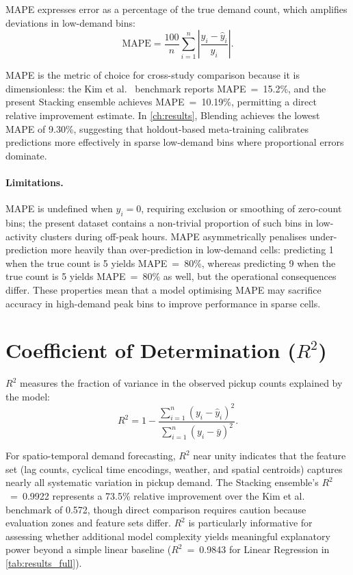 MAPE expresses error as a percentage of the true demand count, which amplifies deviations in low-demand bins:
\begin{equation}
 \text{MAPE} = \frac{100}{n}\sum_{i=1}^n \left|\frac{y_i - \hat{y}_i}{y_i}\right|.
 \label{eq:mape}
\end{equation}

MAPE is the metric of choice for cross-study comparison because it is dimensionless: the Kim et al.~\parencite{kim2020hybrid} benchmark reports MAPE~=~15.2\%, and the present Stacking ensemble achieves MAPE~=~10.19\%, permitting a direct relative improvement estimate. In \autoref{ch:results}, Blending achieves the lowest MAPE of 9.30\%, suggesting that holdout-based meta-training calibrates predictions more effectively in sparse low-demand bins where proportional errors dominate.

\paragraph{Limitations.} MAPE is undefined when $y_i = 0$, requiring exclusion or smoothing of zero-count bins; the present dataset contains a non-trivial proportion of such bins in low-activity clusters during off-peak hours. MAPE asymmetrically penalises under-prediction more heavily than over-prediction in low-demand cells: predicting 1 when the true count is 5 yields MAPE~=~80\%, whereas predicting 9 when the true count is 5 yields MAPE~=~80\% as well, but the operational consequences differ. These properties mean that a model optimising MAPE may sacrifice accuracy in high-demand peak bins to improve performance in sparse cells.

\section{Coefficient of Determination ($R^2$)}

$R^2$ measures the fraction of variance in the observed pickup counts explained by the model:
\begin{equation}
 R^2 = 1 - \frac{\displaystyle\sum_{i=1}^n(y_i-\hat{y}_i)^2}{\displaystyle\sum_{i=1}^n(y_i - \bar{y})^2}.
 \label{eq:r2}
\end{equation}

For spatio-temporal demand forecasting, $R^2$ near unity indicates that the feature set (lag counts, cyclical time encodings, weather, and spatial centroids) captures nearly all systematic variation in pickup demand. The Stacking ensemble's $R^2$~=~0.9922 represents a 73.5\% relative improvement over the Kim et al.~\parencite{kim2020hybrid} benchmark of 0.572, though direct comparison requires caution because evaluation zones and feature sets differ. $R^2$ is particularly informative for assessing whether additional model complexity yields meaningful explanatory power beyond a simple linear baseline ($R^2$~=~0.9843 for Linear Regression in \autoref{tab:results_full}).

